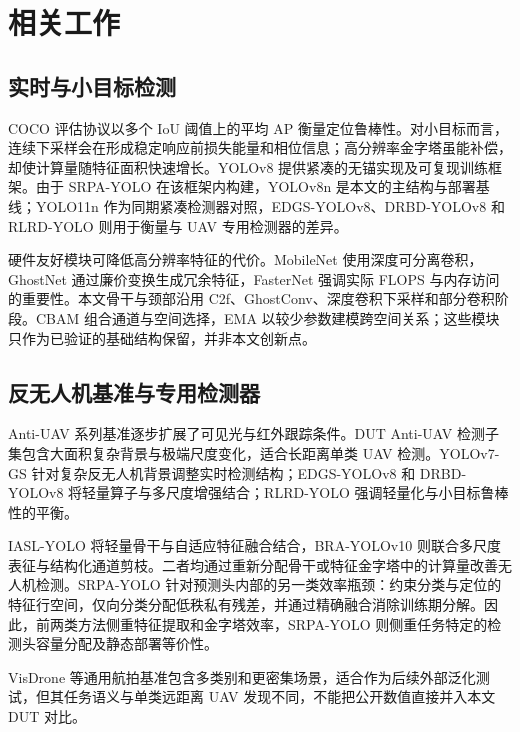 \section{相关工作}

\subsection{实时与小目标检测}
COCO 评估协议以多个 IoU 阈值上的平均 AP 衡量定位鲁棒性\cite{lin2014coco}。对小目标而言，连续下采样会在形成稳定响应前损失能量和相位信息；高分辨率金字塔虽能补偿，却使计算量随特征面积快速增长。YOLOv8 提供紧凑的无锚实现及可复现训练框架\cite{ultralytics2023}。由于 SRPA-YOLO 在该框架内构建，YOLOv8n 是本文的主结构与部署基线；YOLO11n 作为同期紧凑检测器对照，EDGS-YOLOv8、DRBD-YOLOv8 和 RLRD-YOLO 则用于衡量与 UAV 专用检测器的差异。

硬件友好模块可降低高分辨率特征的代价。MobileNet 使用深度可分离卷积\cite{howard2017mobilenets}，GhostNet 通过廉价变换生成冗余特征\cite{han2020ghostnet}，FasterNet 强调实际 FLOPS 与内存访问的重要性\cite{chen2023fasternet}。本文骨干与颈部沿用 C2f、GhostConv、深度卷积下采样和部分卷积阶段。CBAM 组合通道与空间选择\cite{woo2018cbam}，EMA 以较少参数建模跨空间关系\cite{ouyang2023ema}；这些模块只作为已验证的基础结构保留，并非本文创新点。

\subsection{反无人机基准与专用检测器}
Anti-UAV 系列基准逐步扩展了可见光与红外跟踪条件\cite{zhao2022antiuav,jiang2023antiuav,huang2024antiuav410}。DUT Anti-UAV 检测子集包含大面积复杂背景与极端尺度变化，适合长距离单类 UAV 检测。YOLOv7-GS 针对复杂反无人机背景调整实时检测结构\cite{bo2024yolov7gs}；EDGS-YOLOv8 和 DRBD-YOLOv8 将轻量算子与多尺度增强结合\cite{huang2024edgs,jiang2024drbd}；RLRD-YOLO 强调轻量化与小目标鲁棒性的平衡\cite{li2025rlrd}。

IASL-YOLO 将轻量骨干与自适应特征融合结合，BRA-YOLOv10 则联合多尺度表征与结构化通道剪枝\cite{yang2025iasl,zhang2025brayolo}。二者均通过重新分配骨干或特征金字塔中的计算量改善无人机检测。SRPA-YOLO 针对预测头内部的另一类效率瓶颈：约束分类与定位的特征行空间，仅向分类分配低秩私有残差，并通过精确融合消除训练期分解。因此，前两类方法侧重特征提取和金字塔效率，SRPA-YOLO 则侧重任务特定的检测头容量分配及静态部署等价性。

VisDrone 等通用航拍基准包含多类别和更密集场景\cite{zhu2018visdrone}，适合作为后续外部泛化测试，但其任务语义与单类远距离 UAV 发现不同，不能把公开数值直接并入本文 DUT 对比。


